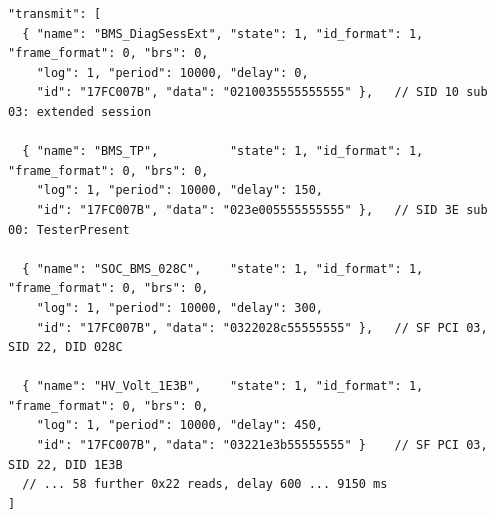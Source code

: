 \begin{lstlisting}[caption={[A transmit-list entry]The first four entries of the 62-entry transmit list, verbatim from the
deployed \texttt{config-01.08.json}. Entries 1--2 open and hold the diagnostic session;
entries 3 onward are the \hex{22} reads, staggered by 150\,ms.},label={lst:canedge_tx}]
"transmit": [
  { "name": "BMS_DiagSessExt", "state": 1, "id_format": 1, "frame_format": 0, "brs": 0,
    "log": 1, "period": 10000, "delay": 0,
    "id": "17FC007B", "data": "0210035555555555" },   // SID 10 sub 03: extended session

  { "name": "BMS_TP",          "state": 1, "id_format": 1, "frame_format": 0, "brs": 0,
    "log": 1, "period": 10000, "delay": 150,
    "id": "17FC007B", "data": "023e005555555555" },   // SID 3E sub 00: TesterPresent

  { "name": "SOC_BMS_028C",    "state": 1, "id_format": 1, "frame_format": 0, "brs": 0,
    "log": 1, "period": 10000, "delay": 300,
    "id": "17FC007B", "data": "0322028c55555555" },   // SF PCI 03, SID 22, DID 028C

  { "name": "HV_Volt_1E3B",    "state": 1, "id_format": 1, "frame_format": 0, "brs": 0,
    "log": 1, "period": 10000, "delay": 450,
    "id": "17FC007B", "data": "03221e3b55555555" }    // SF PCI 03, SID 22, DID 1E3B
  // ... 58 further 0x22 reads, delay 600 ... 9150 ms
]
\end{lstlisting}


